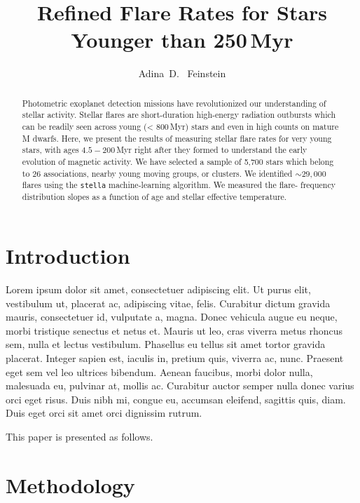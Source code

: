 \documentclass[twocolumn]{aastex631}
\begin{document}
\title{Refined Flare Rates for Stars Younger than 250\,Myr}

\author{Adina~D.~ Feinstein}

\begin{abstract}
    Photometric exoplanet detection missions have revolutionized our understanding
    of stellar activity. Stellar flares are short-duration high-energy radiation
    outbursts which can be readily seen across young (< 800\,Myr) stars and even
    in high counts on mature M dwarfs. Here, we present the results of measuring
    stellar flare rates for very young stars, with ages $4.5 - 200$\,Myr right
    after they formed to understand the early evolution of magnetic activity. We
    have selected a sample of 5,700 stars which belong to 26 associations,
    nearby young moving groups, or clusters. We identified $\sim 29,000$ flares
    using the \texttt{stella} machine-learning algorithm. We measured the flare-
    frequency distribution slopes as a function of age and stellar effective
    temperature.
\end{abstract}

\section{Introduction}
\label{sec:intro}

Lorem ipsum dolor sit amet, consectetuer adipiscing elit.
Ut purus elit, vestibulum ut, placerat ac, adipiscing vitae, felis.
Curabitur dictum gravida mauris, consectetuer id, vulputate a, magna.
Donec vehicula augue eu neque, morbi tristique senectus et netus et.
Mauris ut leo, cras viverra metus rhoncus sem, nulla et lectus vestibulum.
Phasellus eu tellus sit amet tortor gravida placerat.
Integer sapien est, iaculis in, pretium quis, viverra ac, nunc.
Praesent eget sem vel leo ultrices bibendum.
Aenean faucibus, morbi dolor nulla, malesuada eu, pulvinar at, mollis ac.
Curabitur auctor semper nulla donec varius orci eget risus.
Duis nibh mi, congue eu, accumsan eleifend, sagittis quis, diam.
Duis eget orci sit amet orci dignissim rutrum.

This paper is presented as follows.

\section{Methodology}
\label{sec:methods}
\end{document}
